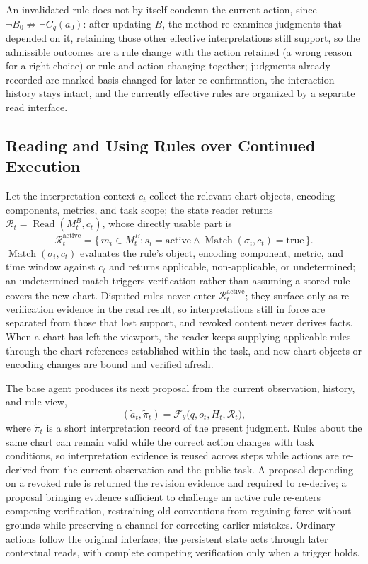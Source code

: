 An invalidated rule does not by itself condemn the
current action, since
$\lnot B_0 \not\Rightarrow \lnot C_q(a_0)$: after
updating $B$, the method re-examines judgments that
depended on it, retaining those other effective
interpretations still support, so the admissible
outcomes are a rule change with the action retained (a
wrong reason for a right choice) or rule and action
changing together; judgments already recorded are
marked basis-changed for later re-confirmation, the
interaction history stays intact, and the currently
effective rules are organized by a separate read
interface.

\subsection{Reading and Using Rules over Continued
Execution}
\label{sec:method:read}

Let the interpretation context $c_t$ collect the
relevant chart objects, encoding components, metrics,
and task scope; the state reader returns
$\mathcal{R}_t = \operatorname{Read}(M_t^B, c_t)$,
whose directly usable part is
\begin{equation}\label{eq:read}
\mathcal{R}_t^{\mathrm{active}}
=
\{\, m_i \in M_t^B :
s_i = \mathrm{active}
\land
\operatorname{Match}(\sigma_i, c_t) = \mathrm{true}
\,\}.
\end{equation}
$\operatorname{Match}(\sigma_i, c_t)$ evaluates the
rule's object, encoding component, metric, and time
window against $c_t$ and returns applicable,
non-applicable, or undetermined; an undetermined match
triggers verification rather than assuming a stored
rule covers the new chart.
Disputed rules never enter
$\mathcal{R}^{\mathrm{active}}_t$; they surface only
as re-verification evidence in the read result, so
interpretations still in force are separated from
those that lost support, and revoked content never
derives facts.
When a chart has left the viewport, the reader keeps
supplying applicable rules through the chart references
established within the task, and new chart objects or
encoding changes are bound and verified afresh.

The base agent produces its next proposal from the
current observation, history, and rule view,
\begin{equation}\label{eq:policy}
(\widetilde{a}_t, \widetilde{\pi}_t)
=
\mathcal{F}_\theta
\bigl(q, o_t, H_t, \mathcal{R}_t\bigr),
\end{equation}
where $\widetilde{\pi}_t$ is a short interpretation
record of the present judgment.
Rules about the same chart can remain valid while the
correct action changes with task conditions, so
interpretation evidence is reused across steps while
actions are re-derived from the current observation and
the public task.
A proposal depending on a revoked rule is returned the
revision evidence and required to re-derive; a proposal
bringing evidence sufficient to challenge an active
rule re-enters competing verification, restraining old
conventions from regaining force without grounds while
preserving a channel for correcting earlier mistakes.
Ordinary actions follow the original interface; the
persistent state acts through later contextual reads,
with complete competing verification only when a
trigger holds.

